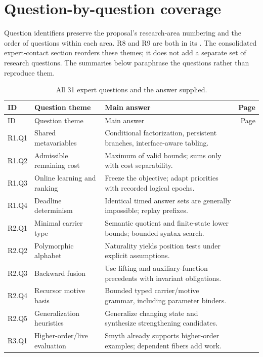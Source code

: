 \section{Question-by-question coverage}\label{sec:coverage}

Question identifiers preserve the proposal's research-area numbering and the
order of questions within each area. R8 and R9 are both in its
. The consolidated expert-contact section
reorders these themes; it does not add a separate set of research questions.
The summaries below paraphrase the questions rather than reproduce them.

\begin{longtable}{@{}L{17mm}L{43mm}L{82mm}r@{}}
\caption{All 31 expert questions and the answer supplied.}\\
\toprule
ID & Question theme & Main answer & Page\\
\midrule
\endfirsthead
\toprule ID & Question theme & Main answer & Page\\\midrule
\endhead
R1.Q1 & Shared metavariables & Conditional factorization, persistent branches, interface-aware tabling. & \pageref{q:R1.Q1}\\[4pt]
R1.Q2 & Admissible remaining cost & Maximum of valid bounds; sums only with cost separability. & \pageref{q:R1.Q2}\\[4pt]
R1.Q3 & Online learning and ranking & Freeze the objective; adapt priorities with recorded logical epochs. & \pageref{q:R1.Q3}\\[4pt]
R1.Q4 & Deadline determinism & Identical timed answer sets are generally impossible; replay prefixes. & \pageref{q:R1.Q4}\\[4pt]
R2.Q1 & Minimal carrier type & Semantic quotient and finite-state lower bounds; bounded syntax search. & \pageref{q:R2.Q1}\\[4pt]
R2.Q2 & Polymorphic alphabet & Naturality yields position tests under explicit assumptions. & \pageref{q:R2.Q2}\\[4pt]
R2.Q3 & Backward fusion & Use lifting and auxiliary-function precedents with invariant obligations. & \pageref{q:R2.Q3}\\[4pt]
R2.Q4 & Recursor motive basis & Bounded typed carrier/motive grammar, including parameter binders. & \pageref{q:R2.Q4}\\[4pt]
R2.Q5 & Generalization heuristics & Generalize changing state and synthesize strengthening candidates. & \pageref{q:R2.Q5}\\[4pt]
R3.Q1 & Higher-order/live evaluation & Smyth already supports higher-order examples; dependent fibers add work. & \pageref{q:R3.Q1}\\[4pt]

\end{longtable}
